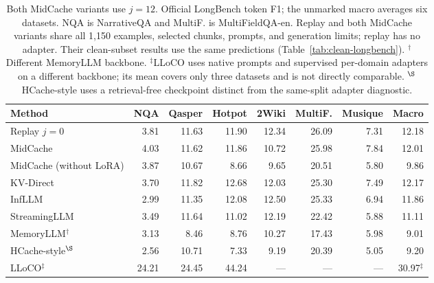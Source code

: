 \begin{table}[htbp]
\centering
\small
\setlength{\tabcolsep}{4pt}
\begin{tabular}{@{}lrrrrrrr@{}}
\toprule
Method & NQA & Qasper & Hotpot & 2Wiki & MultiF. & Musique & Macro \\
\midrule
Replay $j=0$ & 3.81 & 11.63 & 11.90 & 12.34 & 26.09 & 7.31 & 12.18 \\
MidCache & 4.03 & 11.62 & 11.86 & 10.72 & 25.98 & 7.84 & 12.01 \\
MidCache (without LoRA) & 3.87 & 10.67 & 8.66 & 9.65 & 20.51 & 5.80 & 9.86 \\
KV-Direct & 3.70 & 11.82 & 12.68 & 12.03 & 25.30 & 7.49 & 12.17 \\
InfLLM & 2.99 & 11.35 & 12.08 & 12.50 & 25.33 & 6.94 & 11.86 \\
StreamingLLM & 3.49 & 11.64 & 11.02 & 12.19 & 22.42 & 5.88 & 11.11 \\
MemoryLLM$^\dagger$ & 3.13 & 8.46 & 8.76 & 10.27 & 17.43 & 5.98 & 9.01 \\
HCache-style$^{\S}$ & 2.56 & 10.71 & 7.33 & 9.19 & 20.39 & 5.05 & 9.20 \\
\midrule
LLoCO$^\ddagger$ & 24.21 & 24.45 & 44.24 & --- & --- & --- & 30.97$^\ddagger$ \\
\bottomrule
\end{tabular}
\caption{Both MidCache variants use $j=12$. Official LongBench token F1; the unmarked macro averages six datasets. NQA is NarrativeQA and MultiF. is MultiFieldQA-en. Replay and both MidCache variants share all 1,150 examples, selected chunks, prompts, and generation limits; replay has no adapter. Their clean-subset results use the same predictions (Table~\ref{tab:clean-longbench}). $^\dagger$Different MemoryLLM backbone. $^\ddagger$LLoCO uses native prompts and supervised per-domain adapters on a different backbone; its mean covers only three datasets and is not directly comparable. $^{\S}$HCache-style uses a retrieval-free checkpoint distinct from the same-split adapter diagnostic.}
\label{tab:longbench-detail}
\end{table}
